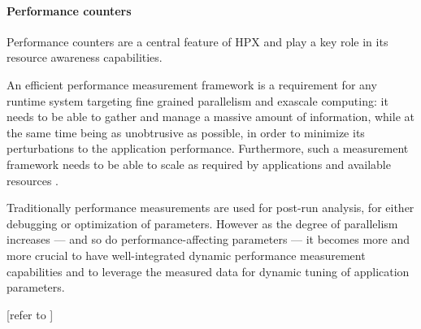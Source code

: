 \paragraph{Performance counters}
Performance counters are a central feature of HPX and play a key role in its resource awareness capabilities.

An efficient performance measurement framework is a requirement for any runtime system targeting fine grained parallelism and exascale computing: it needs to be able to gather and manage a massive amount of information, while at the same time being as unobtrusive as possible, in order to minimize its perturbations to the application performance. Furthermore, such a measurement framework needs to be able to scale as required by applications and available resources \cite{amatya2014parallel}.

Traditionally performance measurements are used for post-run analysis, for either debugging or optimization of parameters.
However as the degree of parallelism increases --- and so do performance-affecting parameters --- it becomes more and more crucial to have well-integrated dynamic performance measurement capabilities and to leverage the measured data for dynamic tuning of application parameters.

[\TODO refer to \cite{grubel2016using}]

